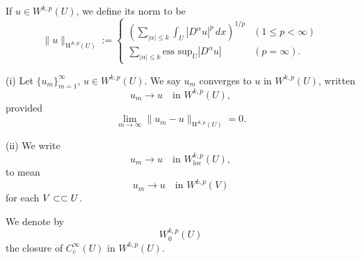 \begin{definition}[Norm on $W^{k,p}(U)$]
\label{def:sobolev-norm}

If $u \in W^{k,p}(U)$, we define its norm to be
$$\|u\|_{W^{k,p}(U)} := \begin{cases}
\left(\sum_{|\alpha| \le k} \int_U |D^\alpha u|^p\,dx\right)^{1/p} & (1 \le p < \infty) \\
\sum_{|\alpha| \le k} \text{ess sup}_U |D^\alpha u| & (p = \infty).
\end{cases}$$
\end{definition}

\begin{definition}
\label{def:sobolev-convergence}

(i) Let $\{u_m\}_{m=1}^\infty$, $u \in W^{k,p}(U)$. We say $u_m$ converges to $u$ in $W^{k,p}(U)$, written
$$u_m \to u \quad \text{in } W^{k,p}(U),$$
provided
$$\lim_{m \to \infty} \|u_m - u\|_{W^{k,p}(U)} = 0.$$

(ii) We write
$$u_m \to u \quad \text{in } W^{k,p}_{\text{loc}}(U),$$
to mean
$$u_m \to u \quad \text{in } W^{k,p}(V)$$
for each $V \subset\subset U$.
\end{definition}

\begin{definition}
\label{def:sobolev-space-zero-boundary}

We denote by
$$W_0^{k,p}(U)$$
the closure of $C_c^\infty(U)$ in $W^{k,p}(U)$.
\end{definition}


